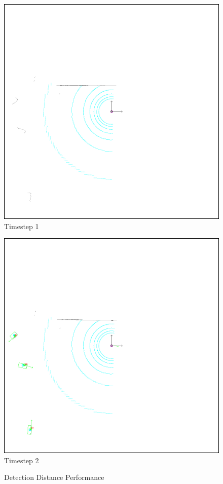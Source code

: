 \documentclass[11pt,oneside,openright]{mpreport}
\begin{document}
\begin{figure}[htb]
  \caption{Detection Distance Performance} 
    \centering
    \begin{minipage}[t]{0.49\textwidth}
        \centering
        \includegraphics[width=\textwidth]{bilder/alg/img100001_r.png}
        Timestep 1
    \end{minipage}%
    \hfill
    \begin{minipage}[t]{0.49\textwidth}
        \centering
	\includegraphics[width=\textwidth]{bilder/alg/img100002_r.png}
        Timestep 2
    \end{minipage}
    \label{detection_performance}
\end{figure}
\end{document}
